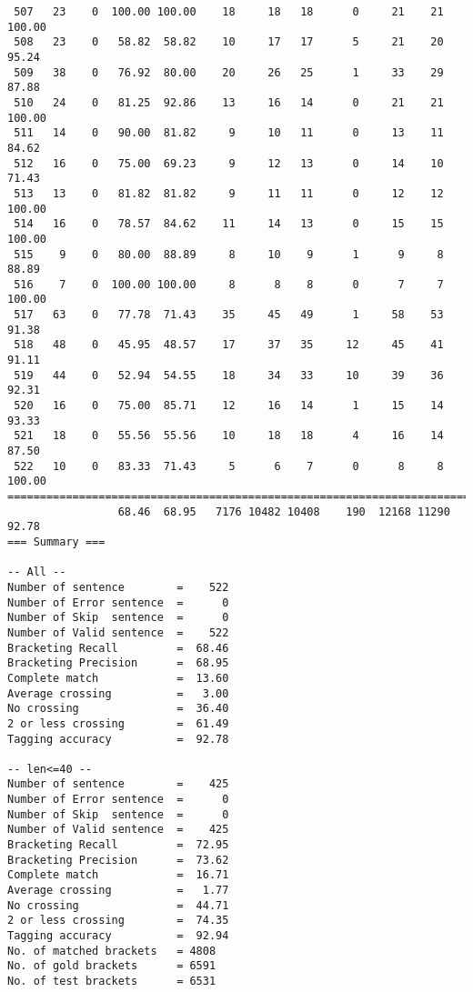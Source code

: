 \begin{verbatim}
 507   23    0  100.00 100.00    18     18   18      0     21    21   100.00
 508   23    0   58.82  58.82    10     17   17      5     21    20    95.24
 509   38    0   76.92  80.00    20     26   25      1     33    29    87.88
 510   24    0   81.25  92.86    13     16   14      0     21    21   100.00
 511   14    0   90.00  81.82     9     10   11      0     13    11    84.62
 512   16    0   75.00  69.23     9     12   13      0     14    10    71.43
 513   13    0   81.82  81.82     9     11   11      0     12    12   100.00
 514   16    0   78.57  84.62    11     14   13      0     15    15   100.00
 515    9    0   80.00  88.89     8     10    9      1      9     8    88.89
 516    7    0  100.00 100.00     8      8    8      0      7     7   100.00
 517   63    0   77.78  71.43    35     45   49      1     58    53    91.38
 518   48    0   45.95  48.57    17     37   35     12     45    41    91.11
 519   44    0   52.94  54.55    18     34   33     10     39    36    92.31
 520   16    0   75.00  85.71    12     16   14      1     15    14    93.33
 521   18    0   55.56  55.56    10     18   18      4     16    14    87.50
 522   10    0   83.33  71.43     5      6    7      0      8     8   100.00
============================================================================
                 68.46  68.95   7176 10482 10408    190  12168 11290    92.78
=== Summary ===

-- All --
Number of sentence        =    522
Number of Error sentence  =      0
Number of Skip  sentence  =      0
Number of Valid sentence  =    522
Bracketing Recall         =  68.46
Bracketing Precision      =  68.95
Complete match            =  13.60
Average crossing          =   3.00
No crossing               =  36.40
2 or less crossing        =  61.49
Tagging accuracy          =  92.78

-- len<=40 --
Number of sentence        =    425
Number of Error sentence  =      0
Number of Skip  sentence  =      0
Number of Valid sentence  =    425
Bracketing Recall         =  72.95
Bracketing Precision      =  73.62
Complete match            =  16.71
Average crossing          =   1.77
No crossing               =  44.71
2 or less crossing        =  74.35
Tagging accuracy          =  92.94
No. of matched brackets   = 4808
No. of gold brackets      = 6591
No. of test brackets      = 6531

\end{verbatim}

\normalsize

